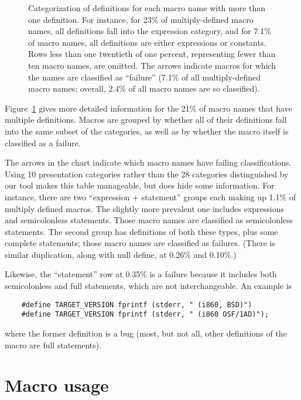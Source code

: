 \documentclass[10pt]{article}
\newcommand{\captionsmall}[1]{\caption[]{\small #1}}
\begin{document}
\begin{figure}
  {\small\centerline{}}
  
  \captionsmall{Categorization of definitions for each macro name with more
    than one definition.  For instance, for 23\% of multiply-defined macro
    names, all definitions fall into the expression category, and for 7.1\%
    of macro names, all definitions are either expressions or constants.
    Rows less than one twentieth of one percent, representing fewer than
    ten macro names, are omitted.  The arrows indicate macros for which the
    names are classified as ``failure'' (7.1\% of all multiply-defined
    macro names; overall, 2.4\% of all macro names are so classified).}

  \label{fig:subset-categories}
\end{figure}

Figure~\ref{fig:subset-categories} gives more detailed information for the
21\% of macro names that have multiple definitions.  Macros are grouped by
whether all of their definitions fall into the same subset of the
categories, as well as by whether the macro itself is classified as a
failure.

The arrows in the chart indicate which macro names have failing
classifications.  Using 10 presentation categories rather than the 28
categories distinguished by our tool makes this table manageable, but does
hide some information.  For instance, there are two ``expression +
statement'' groups each making up 1.1\% of multiply defined macros.  The
slightly more prevalent one includes expressions and semicolonless
statements.  Those macro names are classified as semicolonless statements.
The second group has definitions of both these types, plus some complete
statements; those macro names are classified as failures.  (There is
similar duplication, along with null define, at 0.26\% and 0.10\%.)

Likewise, the ``statement'' row at 0.35\% is a failure because it includes
both semicolonless and full statements, which are not interchangeable.  An
example is
\begin{verbatim}
    #define TARGET_VERSION fprintf (stderr, " (i860, BSD)")
    #define TARGET_VERSION fprintf (stderr, " (i860 OSF/1AD)");
\end{verbatim}
where the former definition is a bug (most, but not all, other definitions
of the macro are full statements).




\section{Macro usage}
\end{document}
